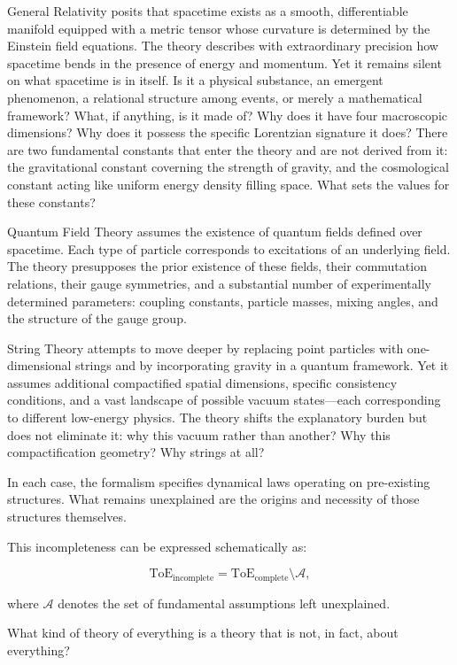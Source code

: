 General Relativity posits that spacetime exists as a smooth, differentiable manifold equipped with a metric tensor whose curvature is determined by the Einstein field equations. 
The theory describes with extraordinary precision how spacetime bends in the presence of energy and momentum. 
Yet it remains silent on what spacetime is in itself. 
Is it a physical substance, an emergent phenomenon, a relational structure among events, or merely a mathematical framework? 
What, if anything, is it made of? Why does it have four macroscopic dimensions? Why does it possess the specific Lorentzian signature it does? 
There are two fundamental constants that enter the theory and are not derived from it: the gravitational constant coverning the strength of gravity, 
and the cosmological constant acting like uniform energy density filling space. What sets the values for these constants?

Quantum Field Theory assumes the existence of quantum fields defined over spacetime. 
Each type of particle corresponds to excitations of an underlying field. 
The theory presupposes the prior existence of these fields, their commutation relations, their gauge symmetries, and a substantial number of experimentally determined parameters: 
coupling constants, particle masses, mixing angles, and the structure of the gauge group. 

String Theory attempts to move deeper by replacing point particles with one-dimensional strings and by incorporating gravity in a quantum framework. 
Yet it assumes additional compactified spatial dimensions, specific consistency conditions, and a vast landscape of possible vacuum states—each corresponding to different low-energy physics. 
The theory shifts the explanatory burden but does not eliminate it: why this vacuum rather than another? Why this compactification geometry? Why strings at all?

In each case, the formalism specifies dynamical laws operating on pre-existing structures. What remains unexplained are the origins and necessity of those structures themselves.

This incompleteness can be expressed schematically as:

\[
\text{ToE}_{\text{incomplete}} = \text{ToE}_{\text{complete}} \setminus \mathcal{A},
\]

where $\mathcal{A}$ denotes the set of fundamental assumptions left unexplained.

What kind of theory of everything is a theory that is not, in fact, about everything?

